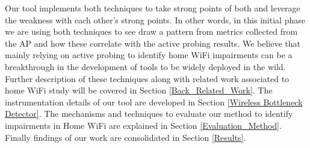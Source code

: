 Our tool implements both techniques to take strong points of both and leverage the weakness with each other's strong points. In other words, in this initial phase we are using both techniques to see draw a pattern from metrics collected from the AP and how these correlate with the active probing results. We believe that mainly relying on active probing to identify home WiFi impairments can be a breakthrough in the development of tools to be widely deployed in the wild. Further description of these techniques along with related work associated to home WiFi study will be covered in Section \ref{Back_Related_Work}. The instrumentation details of our tool are developed in Section \ref{Wireless Bottleneck Detector}. The mechanisms and techniques to evaluate our method to identify impairments in Home WiFi are explained in Section \ref{Evaluation_Method}. Finally findings of our work are consolidated in Section \ref{Results}.
\newpage